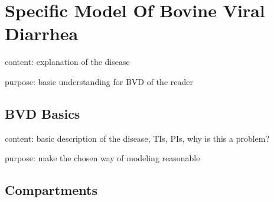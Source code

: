 \section{Specific Model Of Bovine Viral Diarrhea}
content: explanation of the disease

purpose: basic understanding for BVD of the reader
\subsection{BVD Basics}
content: basic description of the disease, TIs, PIs, why is this a problem?

purpose: make the chosen way of modeling reasonable
\subsection{Compartments}
